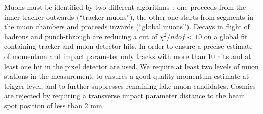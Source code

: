 
Muons must be identified by two different algorithms~\cite{MUONPAS}: one proceeds from 
the inner tracker outwards (``tracker muons''), the other one starts from 
segments in the muon chambers and proceeds inwards (``global muons''). 
Decays in flight of hadrons and punch-through are reducing a cut of $\chi^2/ndof < 10$ 
on a global fit containing tracker and muon detector hits. 
In order to ensure a precise estimate of momentum and impact parameter 
only tracks with more than 10 hits and at least one hit in the pixel detector are used. 
We require at least two levels of muon stations in the measurement, 
to ensures a good quality momentum estimate at trigger level, and
to further suppresses remaining fake muon candidates.
Cosmics are rejected by requiring a transverse impact parameter distance to the beam spot
position of less than 2 mm.
